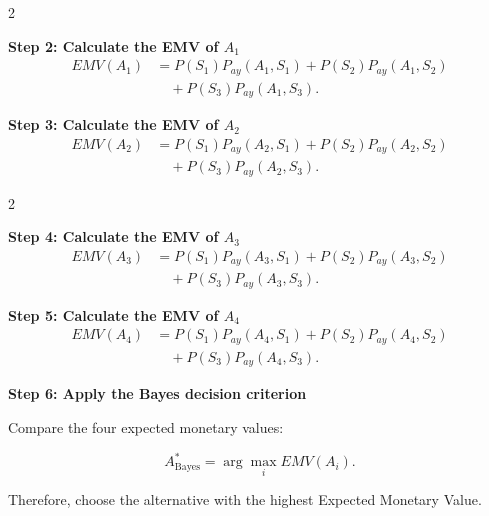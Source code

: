 	\noindent
	\setlength{\columnseprule}{0.4pt}
	
	\begin{multicols}{2}
		\vspace{0pt}
		
		\textbf{Step 2: Calculate the EMV of $A_1$}
		\[
		\begin{aligned}
			EMV(A_1)
			&= P(S_1)P_{ay}(A_1,S_1) + P(S_2)P_{ay}(A_1,S_2) \\
			&\quad + P(S_3)P_{ay}(A_1,S_3).
		\end{aligned}
		\]
		
		\columnbreak
		
		\textbf{Step 3: Calculate the EMV of $A_2$}
		\[
		\begin{aligned}
			EMV(A_2)
			&= P(S_1)P_{ay}(A_2,S_1) + P(S_2)P_{ay}(A_2,S_2) \\
			&\quad + P(S_3)P_{ay}(A_2,S_3).
		\end{aligned}
		\]
		
	\end{multicols}
	
	\begin{multicols}{2}
		\vspace{0pt}
		
		\textbf{Step 4: Calculate the EMV of $A_3$}
		\[
		\begin{aligned}
			EMV(A_3)
			&= P(S_1)P_{ay}(A_3,S_1) + P(S_2)P_{ay}(A_3,S_2) \\
			&\quad + P(S_3)P_{ay}(A_3,S_3).
		\end{aligned}
		\]
		
		\columnbreak
		
		\textbf{Step 5: Calculate the EMV of $A_4$}
		\[
		\begin{aligned}
			EMV(A_4)
			&= P(S_1)P_{ay}(A_4,S_1) + P(S_2)P_{ay}(A_4,S_2) \\
			&\quad + P(S_3)P_{ay}(A_4,S_3).
		\end{aligned}
		\]
		
	\end{multicols}
	
	\setlength{\columnseprule}{0pt}
	
	\textbf{Step 6: Apply the Bayes decision criterion}
	
	Compare the four expected monetary values:
	
	$$
	A^*_{\mathrm{Bayes}}
	=
	\arg\max_i EMV(A_i).
	$$
	
	Therefore, choose the alternative with the highest Expected Monetary
	Value.
	
